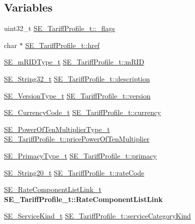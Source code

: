 \subsection*{Variables}
\begin{DoxyCompactItemize}
\item 
uint32\+\_\+t \hyperlink{group__TariffProfile_gaa78d09e0c7107d9a1f284ae5704cf953}{S\+E\+\_\+\+Tariff\+Profile\+\_\+t\+::\+\_\+flags}
\item 
char $\ast$ \hyperlink{group__TariffProfile_gaed6a5a993529e6bd90753740488cf545}{S\+E\+\_\+\+Tariff\+Profile\+\_\+t\+::href}
\item 
\hyperlink{group__mRIDType_gac74622112f3a388a2851b2289963ba5e}{S\+E\+\_\+m\+R\+I\+D\+Type\+\_\+t} \hyperlink{group__TariffProfile_ga176923870d71122bf68ca1ce65ab011c}{S\+E\+\_\+\+Tariff\+Profile\+\_\+t\+::m\+R\+ID}
\item 
\hyperlink{group__String32_gac9f59b06b168b4d2e0d45ed41699af42}{S\+E\+\_\+\+String32\+\_\+t} \hyperlink{group__TariffProfile_gaaad6cdc4afe4bfa613d5a1b234ea195b}{S\+E\+\_\+\+Tariff\+Profile\+\_\+t\+::description}
\item 
\hyperlink{group__VersionType_ga4b8d27838226948397ed99f67d46e2ae}{S\+E\+\_\+\+Version\+Type\+\_\+t} \hyperlink{group__TariffProfile_ga40737bc54b06a6865e6f15c4314fa4f8}{S\+E\+\_\+\+Tariff\+Profile\+\_\+t\+::version}
\item 
\hyperlink{group__CurrencyCode_gadef02433fe757d7bd9fd0d9b59f690a0}{S\+E\+\_\+\+Currency\+Code\+\_\+t} \hyperlink{group__TariffProfile_ga30b65778dba600d5614a0ef2426a5cf8}{S\+E\+\_\+\+Tariff\+Profile\+\_\+t\+::currency}
\item 
\hyperlink{group__PowerOfTenMultiplierType_gaf0317b781dc8dbb9cb6ac4e44a14fdef}{S\+E\+\_\+\+Power\+Of\+Ten\+Multiplier\+Type\+\_\+t} \hyperlink{group__TariffProfile_gade0e52155091cbae350b4670990fc823}{S\+E\+\_\+\+Tariff\+Profile\+\_\+t\+::price\+Power\+Of\+Ten\+Multiplier}
\item 
\hyperlink{group__PrimacyType_ga484b22ef8ff92c8801e6a8b7bd8351eb}{S\+E\+\_\+\+Primacy\+Type\+\_\+t} \hyperlink{group__TariffProfile_gab14fe928719a93747ef7d7c85a4a86f8}{S\+E\+\_\+\+Tariff\+Profile\+\_\+t\+::primacy}
\item 
\hyperlink{group__String20_gac62354528eb48096f8deab6e503a3193}{S\+E\+\_\+\+String20\+\_\+t} \hyperlink{group__TariffProfile_gac8e09cc332d01b111d36845abc32972e}{S\+E\+\_\+\+Tariff\+Profile\+\_\+t\+::rate\+Code}
\item 
\mbox{\label{group__TariffProfile_gac9caa5c71f31c3c3a35630677c2c88e0}} 
\hyperlink{structSE__RateComponentListLink__t}{S\+E\+\_\+\+Rate\+Component\+List\+Link\+\_\+t} {\bfseries S\+E\+\_\+\+Tariff\+Profile\+\_\+t\+::\+Rate\+Component\+List\+Link}
\item 
\hyperlink{group__ServiceKind_ga19a788255c7eeda579474fc6f3cc0810}{S\+E\+\_\+\+Service\+Kind\+\_\+t} \hyperlink{group__TariffProfile_ga0a246c8cd1bc935177a2bf6aca7a328a}{S\+E\+\_\+\+Tariff\+Profile\+\_\+t\+::service\+Category\+Kind}
\end{DoxyCompactItemize}


